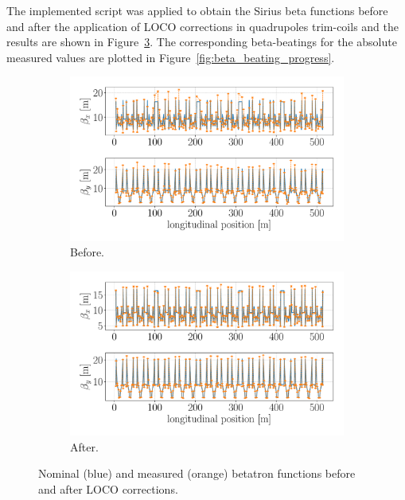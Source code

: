 The implemented script was applied to obtain the Sirius beta functions before and after the application of LOCO corrections in quadrupoles trim-coils and the results are shown in Figure~\ref{fig:beta_tuneshift}. The corresponding beta-beatings for the absolute measured values are plotted in Figure~\ref{fig:beta_beating_progress}.
\begin{figure}
\centering
\begin{subfigure}[t]{0.49\textwidth}
\includegraphics[width=1.0\textwidth]{figures/beta_before_big.pdf}
    \caption{Before.}
    \label{subfig:beta_before}
\end{subfigure}
 \begin{subfigure}[t]{0.49\textwidth}
\includegraphics[width=1.0\textwidth]{figures/beta_after_big.pdf}
    \caption{After.}
    \label{subfig:beta_after}
\end{subfigure}
\caption{Nominal (blue) and measured (orange) betatron functions before and after LOCO corrections.}
\label{fig:beta_tuneshift}
\end{figure}
